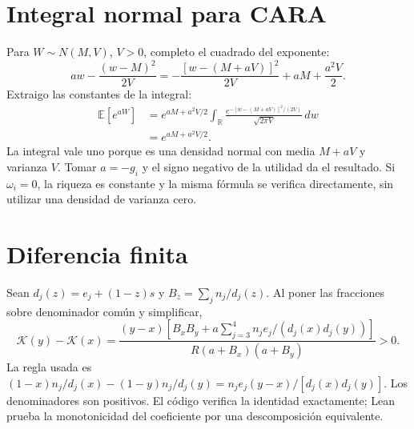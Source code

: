 \documentclass[11pt]{article}
\newcommand{\E}{\mathbb E}
\newcommand{\K}{\mathcal K}
\begin{document}
\section{Integral normal para CARA}
Para $W\sim N(M,V)$, $V>0$, completo el cuadrado del exponente:
\begin{equation}
 aw-\frac{(w-M)^2}{2V}
 =-\frac{[w-(M+aV)]^2}{2V}+aM+\frac{a^2V}{2}.
\end{equation}
Extraigo las constantes de la integral:
\begin{align}
 \E[e^{aW}]&=e^{aM+a^2V/2}
 \int_{\mathbb R}\frac{e^{-[w-(M+aV)]^2/(2V)}}{\sqrt{2\pi V}}\,dw\\
 &=e^{aM+a^2V/2}.
\end{align}
La integral vale uno porque es una densidad normal con media $M+aV$ y
varianza $V$. Tomar $a=-g_i$ y el signo negativo de la utilidad da el
resultado. Si $\omega_i=0$, la riqueza es constante y la misma fórmula se
verifica directamente, sin utilizar una densidad de varianza cero.

\section{Diferencia finita}
Sean $d_j(z)=e_j+(1-z)s$ y $B_z=\sum_jn_j/d_j(z)$. Al poner las fracciones
sobre denominador común y simplificar,
\begin{equation}
 \K(y)-\K(x)=
 \frac{(y-x)\left[B_xB_y+
 a\sum_{j=3}^4 n_je_j/(d_j(x)d_j(y))\right]}
 {R(a+B_x)(a+B_y)}>0.
\end{equation}
La regla usada es
$(1-x)n_j/d_j(x)-(1-y)n_j/d_j(y)
=n_je_j(y-x)/[d_j(x)d_j(y)]$. Los denominadores son positivos.
El código verifica la identidad exactamente; Lean prueba la monotonicidad
del coeficiente por una descomposición equivalente.

\clearpage
\end{document}
